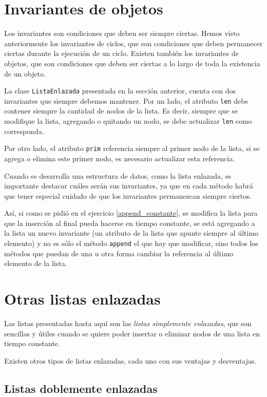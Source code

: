 \section{Invariantes de objetos}

Los invariantes son condiciones que deben ser siempre ciertas.  Hemos visto
anteriormente los invariantes de ciclos, que son condiciones que deben
permanecer ciertas durante la ejecución de un ciclo.  Existen también los
invariantes de objetos, que son condiciones que deben ser ciertas a lo
largo de toda la existencia de un objeto.

La clase \lstinline!ListaEnlazada! presentada en la sección anterior,
cuenta con dos invariantes que siempre debemos mantener.  Por un lado, el
atributo \lstinline!len! debe contener siempre la cantidad de nodos de la
lista.  Es decir, siempre que se modifique la lista, agregando o quitando
un nodo, se debe actualizar \lstinline!len! como corresponda.

Por otro lado, el atributo \lstinline!prim! referencia siempre al primer
nodo de la lista, si se agrega o elimina este primer nodo, es necesario
actualizar esta referencia.

Cuando se desarrolla una estructura de datos, como la lista enlazada, es
importante destacar cuáles serán sus invariantes, ya que en cada método
habrá que tener especial cuidado de que los invariantes permanezcan siempre
ciertos.

Así, si como se pidió en el ejercicio \ref{append_constante}, se modifica
la lista para que la inserción al final pueda hacerse en tiempo constante,
se está agregando a la lista un nuevo invariante (un atributo de la lista
que apunte siempre al último elemento) y no es sólo el método
\lstinline!append! el que hay que modificar, sino todos los métodos que
puedan de una u otra forma cambiar la referencia al último elemento de la
lista.

\section{Otras listas enlazadas}

Las listas presentadas hasta aquí son las {\it listas simplemente
enlazadas}, que son sencillas y útiles cuando se quiere poder insertar o
eliminar nodos de una lista en tiempo constante.

Existen otros tipos de listas enlazadas, cada uno con sus ventajas y
desventajas.

\subsection*{Listas doblemente enlazadas}

